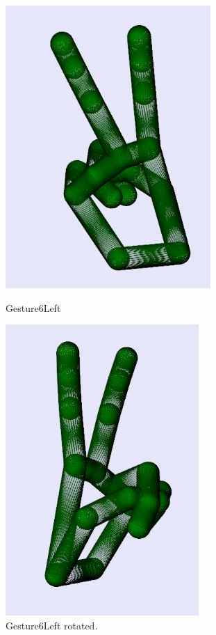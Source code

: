 \begin{figure}[H]
    \centering
    \begin{minipage}{0.5\textwidth}
        \centering
        \includegraphics[scale=.75]{Figures/gesture6Left.JPG} 
        \caption[Gesture6Left]{Gesture6Left}
		\label{fig:Gesture6Left}
    \end{minipage}\hfill
    \begin{minipage}{0.5\textwidth}
        \centering
        \includegraphics[scale=.7]{Figures/gesture6Left_rotated.JPG}
        \caption[Gesture6Left Rotated]{Gesture6Left rotated.}
        \label{fig:Gesture6Left_rotated}
    \end{minipage}
\end{figure}

